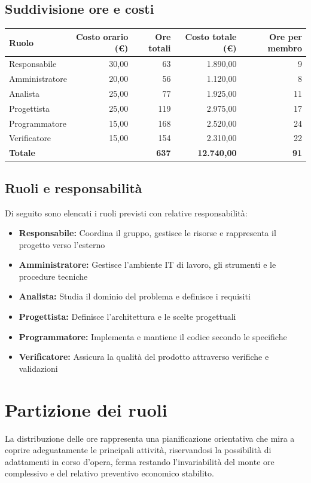 \documentclass[italian, 12pt]{article}
\begin{document}
\subsection{Suddivisione ore e costi}
\begin{table}[h]
\centering
\begin{tabular}{lrrrr}
\toprule
\textbf{Ruolo} & \textbf{Costo orario (€)} & \textbf{Ore totali} & \textbf{Costo totale (€)} & \textbf{Ore per membro} \\
\midrule
Responsabile & 30,00 & 63 & 1.890,00 & 9 \\
Amministratore & 20,00 & 56 & 1.120,00 & 8 \\
Analista & 25,00 & 77 & 1.925,00 & 11 \\
Progettista & 25,00 & 119 & 2.975,00 & 17 \\
Programmatore & 15,00 & 168 & 2.520,00 & 24 \\
Verificatore & 15,00 & 154 & 2.310,00 & 22 \\
\midrule
\textbf{Totale} & & \textbf{637} & \textbf{12.740,00} & \textbf{91} \\
\bottomrule
\end{tabular}
\end{table}

\subsection{Ruoli e responsabilità}
Di seguito sono elencati i ruoli previsti con relative responsabilità:
\begin{itemize}
    \item \textbf{Responsabile:} Coordina il gruppo, gestisce le risorse e rappresenta il progetto verso l'esterno
    \item \textbf{Amministratore:} Gestisce l'ambiente IT di lavoro, gli strumenti e le procedure tecniche
    \item \textbf{Analista:} Studia il dominio del problema e definisce i requisiti
    \item \textbf{Progettista:} Definisce l'architettura e le scelte progettuali
    \item \textbf{Programmatore:} Implementa e mantiene il codice secondo le specifiche
    \item \textbf{Verificatore:} Assicura la qualità del prodotto attraverso verifiche e validazioni
\end{itemize}

\section{Partizione dei ruoli}
La distribuzione delle ore rappresenta una pianificazione orientativa che mira a coprire adeguatamente le principali attività, riservandosi la possibilità di adattamenti in corso d’opera, ferma restando l'invariabilità del monte ore complessivo e del relativo preventivo economico stabilito.
\end{document}
